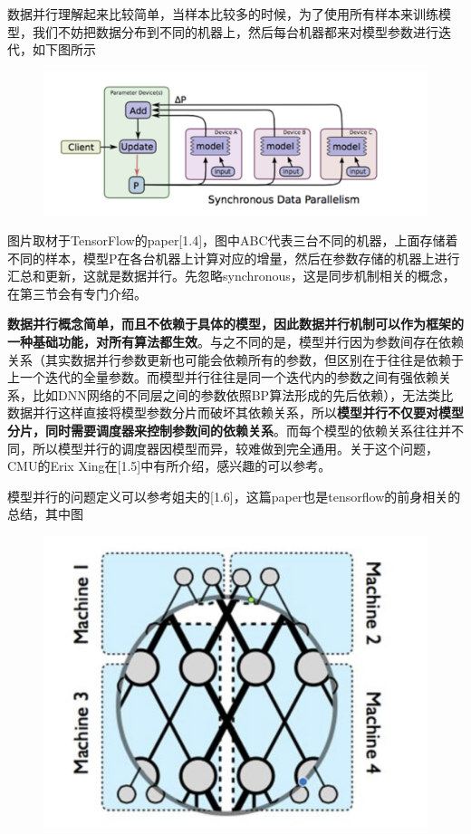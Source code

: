 \documentclass[12pt]{article}
\begin{document}
数据并行理解起来比较简单，当样本比较多的时候，为了使用所有样本来训练模型，我们不妨把数据分布到不同的机器上，然后每台机器都来对模型参数进行迭代，如下图所示
\begin{figure}[H]
    \centering
    \includegraphics[width=1\textwidth]{fig/Large_Scale_Data_Parallerism.png}
\end{figure}

图片取材于TensorFlow的paper[1.4]，图中ABC代表三台不同的机器，上面存储着不同的样本，模型P在各台机器上计算对应的增量，然后在参数存储的机器上进行汇总和更新，这就是数据并行。先忽略synchronous，这是同步机制相关的概念，在第三节会有专门介绍。

\textbf{数据并行概念简单，而且不依赖于具体的模型，因此数据并行机制可以作为框架的一种基础功能，对所有算法都生效}。与之不同的是，模型并行因为参数间存在依赖关系（其实数据并行参数更新也可能会依赖所有的参数，但区别在于往往是依赖于上一个迭代的全量参数。而模型并行往往是同一个迭代内的参数之间有强依赖关系，比如DNN网络的不同层之间的参数依照BP算法形成的先后依赖），无法类比数据并行这样直接将模型参数分片而破坏其依赖关系，所以\textbf{模型并行不仅要对模型分片，同时需要调度器来控制参数间的依赖关系}。而每个模型的依赖关系往往并不同，所以模型并行的调度器因模型而异，较难做到完全通用。关于这个问题，CMU的Erix Xing在[1.5]中有所介绍，感兴趣的可以参考。

模型并行的问题定义可以参考姐夫的[1.6]，这篇paper也是tensorflow的前身相关的总结，其中图
\begin{figure}[H]
    \centering
    \includegraphics[width=.5\textwidth]{fig/Large_Scale_Model_Parallerism.png}
\end{figure}
\end{document}
